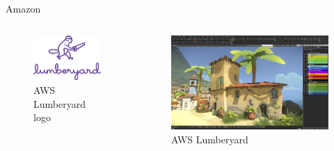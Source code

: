 \begin{frame}{Amazon}
    \begin{columns}[c]
        \begin{figure}
            \centering
            \includegraphics[height=0.40\textheight]{images/Lumberyard_Logo.png}
            \caption{AWS Lumberyard logo \cite{AWS_Lumberyard_logo}}
            \label{fig:AWS_Lumberyard}
        \end{figure}
        \begin{figure}
            \centering
            \includegraphics[height=0.60\textheight]{images/lumberyard_editor_relay_1.jpg}
            \caption{AWS Lumberyard \cite{AWS_Lumberyard_view}}
            \label{fig:social-media}
        \end{figure}
    \end{columns}
\end{frame}
    

